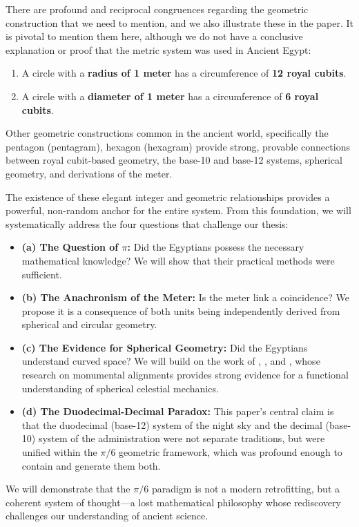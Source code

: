 \documentclass[11pt]{article}
\begin{document}
There are profound and reciprocal congruences regarding the geometric construction that we need to mention, and we also illustrate these in the paper. It is pivotal to mention them here, although we do not have a conclusive explanation or proof that the metric system was used in Ancient Egypt:
\begin{enumerate}
    \item A circle with a \textbf{radius of 1 meter} has a circumference of \textbf{12 royal cubits}.
    \item A circle with a \textbf{diameter of 1 meter} has a circumference of \textbf{6 royal cubits}.
\end{enumerate}

Other geometric constructions common in the ancient world, specifically the pentagon (pentagram), hexagon (hexagram) provide strong, provable connections between royal cubit-based geometry, the base-10 and base-12 systems, spherical geometry, and derivations of the meter. 

The existence of these elegant integer and geometric relationships provides a powerful, non-random anchor for the entire system. From this foundation, we will systematically address the four questions that challenge our thesis:
\begin{itemize}
    \item \textbf{(a) The Question of $\pi$:} Did the Egyptians possess the necessary mathematical knowledge? We will show that their practical methods were sufficient.
    \item \textbf{(b) The Anachronism of the Meter:} Is the meter link a coincidence? We propose it is a consequence of both units being independently derived from spherical and circular geometry.
    \item \textbf{(c) The Evidence for Spherical Geometry:} Did the Egyptians understand curved space? We will build on the work of \cite{spence2000ancient}, \cite{magli2013architecture}, and \cite{belmonte2023astronomy}, whose research on monumental alignments provides strong evidence for a functional understanding of spherical celestial mechanics.
    \item \textbf{(d) The Duodecimal-Decimal Paradox:} This paper's central claim is that the duodecimal (base-12) system of the night sky and the decimal (base-10) system of the administration were not separate traditions, but were unified within the $\pi/6$ geometric framework, which was profound enough to contain and generate them both.
\end{itemize}
We will demonstrate that the $\pi/6$ paradigm is not a modern retrofitting, but a coherent system of thought---a lost mathematical philosophy whose rediscovery challenges our understanding of ancient science.
\end{document}

